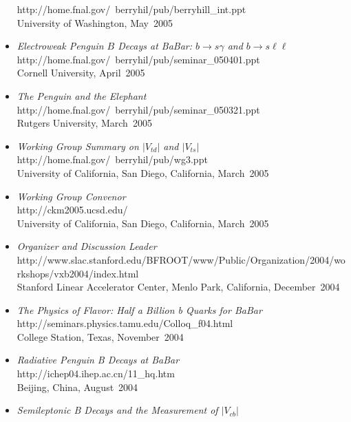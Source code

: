\documentclass [12pt]{report}
\begin{document}
\begin{itemize}
{
{http://home.fnal.gov/~berryhil/pub/berryhill_int.ppt}\\
University of Washington, May~2005}
\item{{\em Electroweak Penguin $B$ Decays at BaBar:  $b\rightarrow s\gamma$ and $b\rightarrow s\ell\ell$}\\ 
{http://home.fnal.gov/~berryhil/pub/seminar_050401.ppt}\\
Cornell University, April~2005}
\item{{\em The Penguin and the Elephant}\\ 
{http://home.fnal.gov/~berryhil/pub/seminar_050321.ppt}\\
Rutgers University, March~2005}
\item{{\em Working Group Summary on $|V_{td}|$ and $|V_{ts}|$ }\\ 
{http://home.fnal.gov/~berryhil/pub/wg3.ppt}\\
University of California, San Diego, California, March~2005}
\item{{\em Working Group Convenor}\\ 
{http://ckm2005.ucsd.edu/}\\
University of California, San Diego, California, March~2005}
\item{{\em Organizer and Discussion Leader}\\ 
{http://www.slac.stanford.edu/BFROOT/www/Public/Organization/2004/workshops/vxb2004/index.html}\\
Stanford Linear Accelerator Center, Menlo Park, California, December~2004}
\item{{\em The Physics of Flavor:  Half a Billion b Quarks for BaBar}\\ 
{http://seminars.physics.tamu.edu/Colloq_f04.html}\\
College Station, Texas, November~2004}
\item{{\em Radiative Penguin B Decays at BaBar}\\ 
{http://ichep04.ihep.ac.cn/11_hq.htm}\\
Beijing, China, August~2004}
\item{{\em Semileptonic B Decays and the Measurement of $|V_{cb}|$}\\ 
}
\end{itemize}
\end{document}
